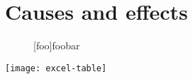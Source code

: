 \section{Causes and effects}

\begin{figure}[h]
\centering

[foo]{foobar}

\end{figure}

\begin{table}
\label{tab:causeandeffects}
  \label{tbl:excel-table}
  \texttt{[image: excel-table]}
\end{table}